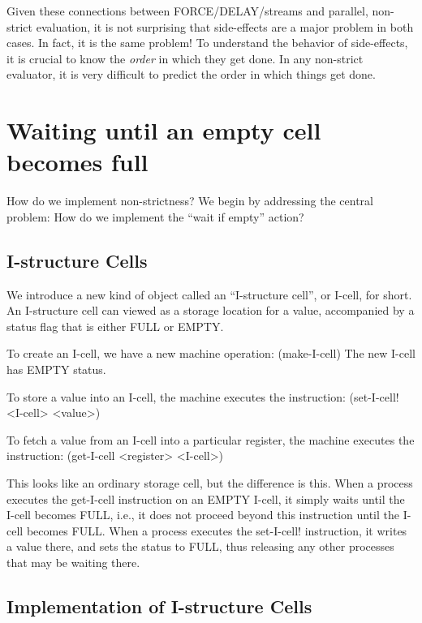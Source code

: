 Given these connections between {\cf FORCE}/{\cf DELAY}/streams and
parallel, non-strict evaluation, it is not surprising that
side-effects are a major problem in both cases.  In fact, it is the
same problem!  To understand the behavior of side-effects, it is
crucial to know the {\em order\/} in which they get done.  In any
non-strict evaluator, it is very difficult to predict the order in
which things get done.


\section{Waiting until an empty cell becomes full}

How do we implement non-strictness? We begin by addressing the central
problem: How do we implement the ``wait if empty'' action?

\subsection{I-structure Cells}

We introduce a new kind of object called an ``I-structure cell'', or I-cell,
for short.  An I-structure cell can viewed as a storage location for a value,
accompanied by a status flag that is either {\cf FULL} or {\cf EMPTY}.

To create an I-cell, we have a new machine operation:
\beginlisp
(make-I-cell)
\endlisp
The new I-cell has {\cf EMPTY} status.

To store a value into an I-cell, the machine executes the instruction:
\beginlisp
(set-I-cell! <I-cell> <value>)
\endlisp

To fetch a value from an I-cell into a particular register, the machine
executes the instruction:
\beginlisp
(get-I-cell <register> <I-cell>)
\endlisp

This looks like an ordinary storage cell, but the difference is this.
When a process executes the {\cf get-I-cell} instruction on an {\cf
EMPTY} I-cell, it simply waits until the I-cell becomes {\cf FULL},
i.e., it does not proceed beyond this instruction until the I-cell
becomes {\cf FULL}.  When a process executes the {\cf set-I-cell!}
instruction, it writes a value there, and sets the status to {\cf
FULL}, thus releasing any other processes that may be waiting there.

\subsection{Implementation of I-structure Cells}

